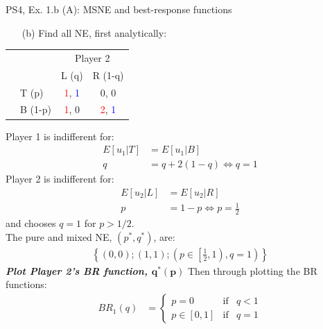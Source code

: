 \begin{frame}{PS4, Ex. 1.b (A): MSNE and best-response functions}
  \begin{multicols}{2}
    \begin{itemize}
      \item[(b)] Find all NE, first analytically:
    \end{itemize}
    \begin{table}
      \begin{tabular}{cl|c|c|}
        & \multicolumn{1}{c}{} & \multicolumn{2}{c}{\color{blue}Player 2}\\
        \parbox[t]{1mm}{}
        &  &  &  \\
        & T (p) & \textcolor{red}{1}, \textcolor{blue}{1} & 0, 0 \\
        & B (1-p) & \textcolor{red}{1}, 0 & \textcolor{red}{2}, \textcolor{blue}{1} \\
      \end{tabular}
    \end{table}
    Player 1 is indifferent for:
    \begin{align*}
      E[u_1|T]&=E[u_1|B]\\
      q &= q + 2(1-q) \Leftrightarrow q = 1
    \end{align*}
    Player 2 is indifferent for:
    \begin{align*}
      E[u_2|L]&=E[u_2|R]\\
      p &= 1-p \Leftrightarrow p = \frac{1}{2}
    \end{align*}
    and chooses $q=1$ for $p>1/2$.\\\medskip
    The pure and mixed NE, $(p^{*},q^{*})$, are:
    \begin{align*}
      \left\{(0,0);(1,1);\left(p\in\left[\frac{1}{2},1\right),q=1\right)\right\}
    \end{align*}
    \textbf{\textit{Plot Player 2's BR function, $\bm{q^{*}(p)}$}}
  \vfill\null \columnbreak
    Then through plotting the BR functions:
    \vspace{-8pt}
    \begin{align*}
      BR_1(q)&=\left\{ \begin{array}{lcl}
          p=0       & \text{if} & q<1 \\
          p\in[0,1] & \text{if} & q=1
      \end{array}\right. \\

\end{align*}
\end{multicols}
\end{frame}
